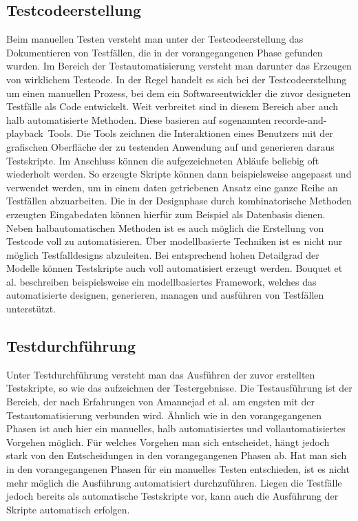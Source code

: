 \subsection{Testcodeerstellung}
\label{subsec:testcodeerstellung}
Beim manuellen Testen versteht man unter der Testcodeerstellung das Dokumentieren von Testfällen, die in der vorangegangenen Phase gefunden wurden. 
Im Bereich der Testautomatisierung versteht man darunter das Erzeugen von wirklichem Testcode.
In der Regel handelt es sich bei der Testcodeerstellung um einen manuellen Prozess, bei dem ein Softwareentwickler die zuvor designeten Testfälle als Code entwickelt.
Weit verbreitet sind in diesem Bereich aber auch halb automatisierte Methoden. Diese basieren auf sogenannten \glqq recorde-and-playback\grqq\ Tools. Die Tools zeichnen die Interaktionen eines Benutzers mit der grafischen Oberfläche der zu testenden Anwendung auf und generieren daraus Testskripte.
Im Anschluss können die aufgezeichneten Abläufe beliebig oft wiederholt werden.
So erzeugte Skripte können dann beispielsweise angepasst und verwendet werden, um in einem daten getriebenen Ansatz eine ganze Reihe an Testfällen abzuarbeiten.
Die in der Designphase durch kombinatorische Methoden erzeugten Eingabedaten können hierfür zum Beispiel als Datenbasis dienen.
Neben halbautomatischen Methoden ist es auch möglich die Erstellung von Testcode voll zu automatisieren.
Über modellbasierte Techniken ist es nicht nur möglich Testfalldesigns abzuleiten. Bei entsprechend hohen Detailgrad der Modelle können Testskripte auch voll automatisiert erzeugt werden.
Bouquet et al. \cite{bouquet_test_2008} beschreiben beispielsweise ein modellbasiertes Framework, welches das automatisierte designen, generieren, managen und ausführen von Testfällen unterstützt.

\subsection{Testdurchführung}
\label{subsec:testdurchführung}
Unter Testdurchführung versteht man das Ausführen der zuvor erstellten Testskripte, so wie das aufzeichnen der Testergebnisse.
Die Testausführung ist der Bereich, der nach Erfahrungen von Amannejad et al. \cite{amannejad_search-based_2014} am engsten mit der Testautomatisierung verbunden wird. Ähnlich wie in den vorangegangenen Phasen ist auch hier ein manuelles, halb automatisiertes und vollautomatisiertes Vorgehen möglich.
Für welches Vorgehen man sich entscheidet, hängt jedoch stark von den Entscheidungen in den vorangegangenen Phasen ab.
Hat man sich in den vorangegangenen Phasen für ein manuelles Testen entschieden, ist es nicht mehr möglich die Ausführung automatisiert durchzuführen. Liegen die Testfälle jedoch bereits als automatische Testskripte vor, kann auch die Ausführung der Skripte automatisch erfolgen.


